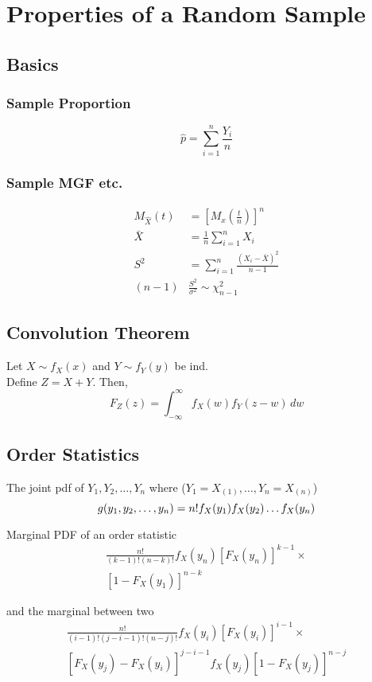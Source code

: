 \section{Properties of a Random Sample}
\subsection{Basics}
	\subsubsection{Sample Proportion}
		\[\hat p = \sum_{i=1}^{n}\frac{Y_i}{n}\]
		
	\subsubsection{Sample MGF etc.}
		\begin{equation*}
			\begin{split}
				M_{\hat X}(t) &= \left[M_x\left(\frac{t}{n}\right)\right]^n \\
				\bar{X} &= \frac{1}{n} \sum_{i=1}^{n}X_i \\
				S^2 &= \sum_{i=1}^{n} \frac{ \left(X_i-\bar{X}\right)^2 }{n-1} \\
				(n-1)&\frac{S^2}{\sigma^2}\sim\chi_{n-1}^2
			\end{split}
		\end{equation*}
		
	\subsection{Convolution Theorem}
		Let \(X\sim f_X(x)\) and \(Y\sim f_Y(y)\) be ind. \\
		Define \(Z=X+Y\). Then,
		\[F_Z(z) =\int_{-\infty}^{\infty} f_X(w)f_Y(z-w)\,dw \]

	\subsection{Order Statistics}
		The joint pdf of $Y_1,Y_2,\ldots,Y_n$ where ($Y_1 = X_{(1)},\ldots, Y_n= X_{(n)}$)
		\[ \footnotesize 
			g(y_1,y_2,\ldots,y_n) = n!f_X(y_1)f_X(y_2)\ldots f_X(y_n)
		\]
		
		Marginal PDF of an order statistic
		\begin{equation*}
			\begin{split}
				\frac{n!}{(k-1)!(n-k)!}f_X(y_n)[F_X(y_n)]^{k-1} \times\\ [1-F_X(y_1)]^{n-k}
			\end{split}
		\end{equation*}
			
		and the marginal between two
		\begin{equation*}
			\begin{split}
				\frac{n!}{(i-1)!(j-i-1)!(n-j)!}f_X(y_i)[F_X(y_i)]^{i-1} \times\\
				[F_X(y_j)-F_X(y_i)]^{j-i-1}
				f_X(y_j)[1-F_X(y_j)]^{n-j}
			\end{split}
		\end{equation*}
		